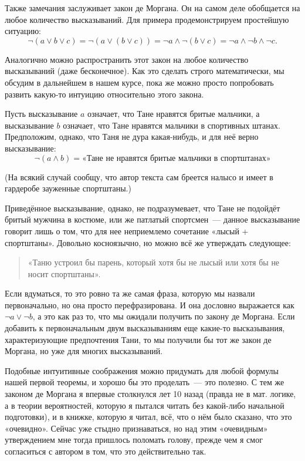 Также замечания заслуживает закон де Моргана. Он на самом деле обобщается на любое количество высказываний. Для примера продемонстрируем простейшую ситуацию:
$$
\neg(a \lor b \lor c) = \neg(a \lor (b \lor c)) = \neg a \land \neg (b \lor c) = \neg a \land \neg b \land \neg c.
$$

Аналогично можно распространить этот закон на любое количество высказываний (даже бесконечное). Как это сделать строго математически, мы обсудим в дальнейшем в нашем курсе, пока же можно просто попробовать развить какую-то интуицию относительно этого закона.

Пусть высказывание $a$ означает, что Тане нравятся бритые мальчики, а высказывание $b$ означает, что Тане нравятся мальчики в спортивных штанах. Предположим, однако, что Таня не дура какая-нибудь, и для неё верно высказывание:
$$
\neg(a \land b) = \text{«Тане не нравятся бритые мальчики в спортштанах»}
$$

(На всякий случай сообщу, что автор текста сам бреется налысо и имеет в гардеробе зауженные спортштаны.)

Приведённое высказывание, однако, не подразумевает, что Тане не подойдёт бритый мужчина в костюме, или же патлатый спортсмен~--- данное высказывание говорит лишь о том, что для нее неприемлемо сочетание «лысый + спортштаны». Довольно косноязычно, но можно всё же утверждать следующее:

\begin{quote}
«Таню устроил бы парень, который хотя бы не лысый или хотя бы не носит спортштаны».
\end{quote}

Если вдуматься, то это ровно та же самая фраза, которую мы назвали первоначально, но она просто перефразирована. И она дословно выражается как $\neg a \lor \neg b$, а это как раз то, что мы ожидали получить по закону де Моргана. Если добавить к первоначальным двум высказываниям еще какие-то высказывания, характеризующие предпочтения Тани, то мы получили бы тот же закон де Моргана, но уже для многих высказываний.

Подобные интуитивные соображения можно придумать для любой формулы нашей первой теоремы, и хорошо бы это проделать~--- это полезно. С тем же законом де Моргана я впервые столкнулся лет 10 назад (правда не в мат. логике, а в теории вероятностей, которую я пытался читать без какой-либо начальной подготовки), и в книжке, которую я читал, всё, что о нём было сказано, что это «очевидно». Сейчас уже стыдно признаваться, но над этим «очевидным» утверждением мне тогда пришлось поломать голову, прежде чем я смог согласиться с автором в том, что это действительно так.


